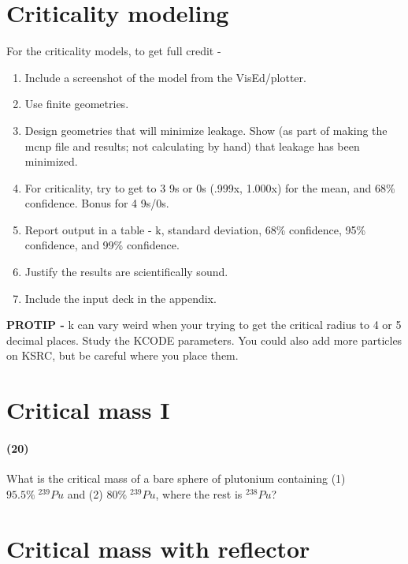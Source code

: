 \documentclass[11pt,a4paper]{article}
\begin{document}
\section*{Criticality modeling}
For the criticality models, to get full credit - 
\begin{enumerate}[leftmargin=*,topsep=0pt,label=\alph*.]
    \item Include a screenshot of the model from the VisEd/plotter.
    \item Use finite geometries.
    \item Design geometries that will minimize leakage. Show (as part of making the mcnp file and results; not calculating by hand) that leakage has been minimized.
    \item For criticality, try to get to 3 9s or 0s (.999x, 1.000x) for the mean, and 68\% confidence. Bonus for 4 9s/0s.
    \item Report output in a table - k, standard deviation, 68\% confidence, 95\% confidence, and 99\% confidence.
    \item Justify the results are scientifically sound.
    \item Include the input deck in the appendix.
\end{enumerate}

\vspace{\baselineskip}

\noindent\textbf{PROTIP - }k can vary weird when your trying to get the critical radius to 4 or 5 decimal places. Study the KCODE parameters. You could also add more particles on KSRC, but be careful where you place them.

\newpage

\section{Critical mass I}
\paragraph*{(20)}
What is the critical mass of a bare sphere of plutonium containing (1) $95.5\% \; ^{239}Pu$ and (2) $80\% \; ^{239}Pu$, where the rest is $^{238}Pu$?





\newpage

\section{Critical mass with reflector}
\end{document}
